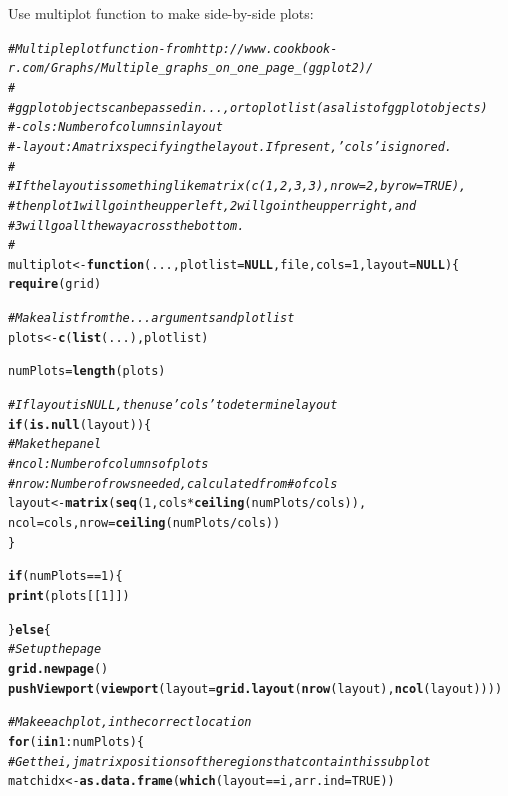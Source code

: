 \documentclass{article}\usepackage[]{graphicx}\usepackage[]{color}
\makeatletter
\newcommand{\hlnum}[1]{\textcolor[rgb]{0.686,0.059,0.569}{#1}}%
\newcommand{\hlcom}[1]{\textcolor[rgb]{0.678,0.584,0.686}{\textit{#1}}}%
\newcommand{\hlopt}[1]{\textcolor[rgb]{0,0,0}{#1}}%
\newcommand{\hlstd}[1]{\textcolor[rgb]{0.345,0.345,0.345}{#1}}%
\newcommand{\hlkwa}[1]{\textcolor[rgb]{0.161,0.373,0.58}{\textbf{#1}}}%
\newcommand{\hlkwb}[1]{\textcolor[rgb]{0.69,0.353,0.396}{#1}}%
\newcommand{\hlkwc}[1]{\textcolor[rgb]{0.333,0.667,0.333}{#1}}%
\newcommand{\hlkwd}[1]{\textcolor[rgb]{0.737,0.353,0.396}{\textbf{#1}}}%
\newenvironment{kframe}{%
 \def\at@end@of@kframe{}%
 \ifinner\ifhmode%
  \def\at@end@of@kframe{\end{minipage}}%
  \begin{minipage}{\columnwidth}%
 \fi\fi%
 \def\FrameCommand##1{\hskip\@totalleftmargin \hskip-\fboxsep
 \colorbox{shadecolor}{##1}\hskip-\fboxsep
     \hskip-\linewidth \hskip-\@totalleftmargin \hskip\columnwidth}%
 \MakeFramed {\advance\hsize-\width
   \@totalleftmargin\z@ \linewidth\hsize
   \@setminipage}}%
 {\par\unskip\endMakeFramed%
 \at@end@of@kframe}
\newenvironment{knitrout}{}{} %
\makeatother
\begin{document}
Use multiplot function to make side-by-side plots:
\begin{knitrout}
\color{fgcolor}\begin{kframe}
\begin{alltt}
\hlcom{# Multiple plot function - from http://www.cookbook-r.com/Graphs/Multiple_graphs_on_one_page_(ggplot2)/}
\hlcom{#}
\hlcom{# ggplot objects can be passed in ..., or to plotlist (as a list of ggplot objects)}
\hlcom{# - cols:   Number of columns in layout}
\hlcom{# - layout: A matrix specifying the layout. If present, 'cols' is ignored.}
\hlcom{#}
\hlcom{# If the layout is something like matrix(c(1,2,3,3), nrow=2, byrow=TRUE),}
\hlcom{# then plot 1 will go in the upper left, 2 will go in the upper right, and}
\hlcom{# 3 will go all the way across the bottom.}
\hlcom{#}
\hlstd{multiplot} \hlkwb{<-} \hlkwa{function}\hlstd{(}\hlkwc{...}\hlstd{,} \hlkwc{plotlist}\hlstd{=}\hlkwa{NULL}\hlstd{,} \hlkwc{file}\hlstd{,} \hlkwc{cols}\hlstd{=}\hlnum{1}\hlstd{,} \hlkwc{layout}\hlstd{=}\hlkwa{NULL}\hlstd{) \{}
  \hlkwd{require}\hlstd{(grid)}

  \hlcom{# Make a list from the ... arguments and plotlist}
  \hlstd{plots} \hlkwb{<-} \hlkwd{c}\hlstd{(}\hlkwd{list}\hlstd{(...), plotlist)}

  \hlstd{numPlots} \hlkwb{=} \hlkwd{length}\hlstd{(plots)}

  \hlcom{# If layout is NULL, then use 'cols' to determine layout}
  \hlkwa{if} \hlstd{(}\hlkwd{is.null}\hlstd{(layout)) \{}
    \hlcom{# Make the panel}
    \hlcom{# ncol: Number of columns of plots}
    \hlcom{# nrow: Number of rows needed, calculated from # of cols}
    \hlstd{layout} \hlkwb{<-} \hlkwd{matrix}\hlstd{(}\hlkwd{seq}\hlstd{(}\hlnum{1}\hlstd{, cols} \hlopt{*} \hlkwd{ceiling}\hlstd{(numPlots}\hlopt{/}\hlstd{cols)),}
                     \hlkwc{ncol} \hlstd{= cols,} \hlkwc{nrow} \hlstd{=} \hlkwd{ceiling}\hlstd{(numPlots}\hlopt{/}\hlstd{cols))}
  \hlstd{\}}

  \hlkwa{if} \hlstd{(numPlots}\hlopt{==}\hlnum{1}\hlstd{) \{}
    \hlkwd{print}\hlstd{(plots[[}\hlnum{1}\hlstd{]])}

  \hlstd{\}} \hlkwa{else} \hlstd{\{}
    \hlcom{# Set up the page}
    \hlkwd{grid.newpage}\hlstd{()}
    \hlkwd{pushViewport}\hlstd{(}\hlkwd{viewport}\hlstd{(}\hlkwc{layout} \hlstd{=} \hlkwd{grid.layout}\hlstd{(}\hlkwd{nrow}\hlstd{(layout),} \hlkwd{ncol}\hlstd{(layout))))}

    \hlcom{# Make each plot, in the correct location}
    \hlkwa{for} \hlstd{(i} \hlkwa{in} \hlnum{1}\hlopt{:}\hlstd{numPlots) \{}
      \hlcom{# Get the i,j matrix positions of the regions that contain this subplot}
      \hlstd{matchidx} \hlkwb{<-} \hlkwd{as.data.frame}\hlstd{(}\hlkwd{which}\hlstd{(layout} \hlopt{==} \hlstd{i,} \hlkwc{arr.ind} \hlstd{=} \hlnum{TRUE}\hlstd{))}


\end{alltt}
\end{kframe}
\end{knitrout}
\end{document}
